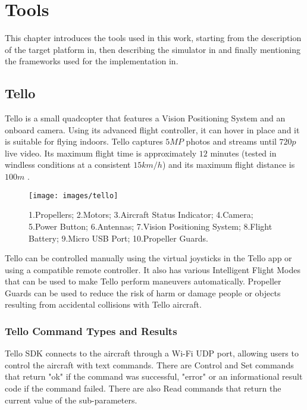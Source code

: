 \chapter{Tools}
\label{chap:impl}

This chapter introduces the tools used in this work, starting from the description of the target platform in, then describing the simulator in and finally mentioning the frameworks used for the implementation in.

\section{Tello}
\label{subsec:tello}
Tello is a small quadcopter that features a Vision Positioning System and an onboard camera. Using its advanced flight controller, it can hover in place and it is suitable for flying indoors. Tello captures $5MP$ photos and streams until $720p$ live video. Its maximum flight time is approximately $12$ minutes (tested in windless conditions at a consistent $15km/h$) and its maximum flight distance is $100m$ \cite[]{djitelloguide}.

\begin{figure}[H]
	\centering
	\texttt{[image: images/tello]}
	\caption[Tello - Aircraft diagram.]{1.Propellers; 2.Motors; 3.Aircraft Status Indicator; 4.Camera; 5.Power Button; 6.Antennas; 7.Vision Positioning System; 8.Flight Battery; 9.Micro USB Port; 10.Propeller Guards.}
	\label{fig:telloairdiagr}
\end{figure}

\noindent Tello can be controlled manually using the virtual joysticks in the Tello app or using a compatible remote controller. It also has various Intelligent Flight Modes that can be used to make Tello perform maneuvers automatically. Propeller Guards can be used to reduce the risk of harm or damage people or objects resulting from accidental collisions with Tello aircraft.

\subsection{Tello Command Types and Results}
\label{subsec:tellosdk}
Tello SDK connects to the aircraft through a Wi-Fi UDP port, allowing users to control the aircraft with text commands. There are Control and Set commands that return "ok" if the command was successful, "error" or an informational result code if the command failed. There are also Read commands that return the current value of the sub-parameters.

